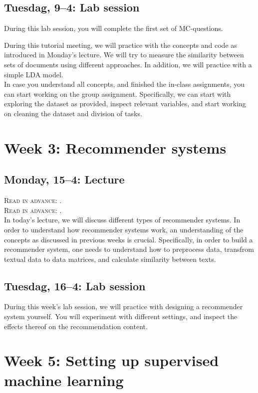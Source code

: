 {\subsection*{Tuesdag, 9--4: Lab session}
During this lab session, you will complete the first set of MC-questions. 

During this tutorial meeting, we will practice with the concepts and code as introduced in Monday's lecture. We will try to measure the similarity between sets of documents using different approaches. In addition, we will practice with a simple LDA model. \\

In case you understand all concepts, and finished the in-class assignments, you can start working on the group assignment.  Specifically, we can start with exploring the dataset as provided, inspect relevant variables, and start working on cleaning the dataset and division of tasks. 

\section*{Week 3: Recommender systems}

\subsection*{Monday, 15--4: Lecture}
\textsc{ Read in advance: \cite{Moller2018}.}\\
\textsc{ Read in advance: \cite{Loecherbach2020}.}\\

In today's lecture, we will discuss different types of recommender systems. In order to understand how recommender systems work, an understanding of the concepts as discussed in previous weeks is crucial. Specifically, in order to build a recommender system, one needs to understand how to preprocess data, transfrom textual data to data matrices, and calculate similarity between texts. 

\subsection*{Tuesdag, 16--4: Lab session}
During this week's lab session, we will practice with designing a recommender system yourself. You will experiment with different settings, and inspect the effects thereof on the recommendation content. 

\section*{Week 5: Setting up supervised machine learning}

}
